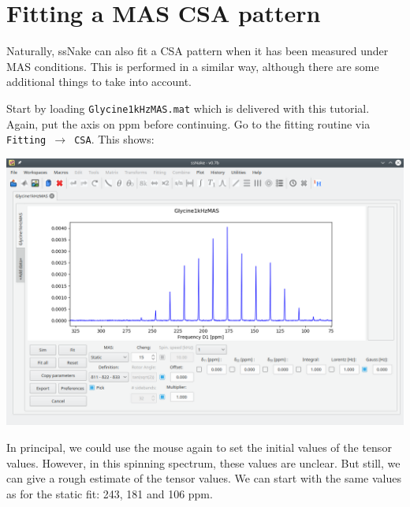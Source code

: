\documentclass[11pt,a4paper]{article}
\begin{document}
\section{Fitting a MAS CSA pattern}
Naturally, ssNake can also fit a CSA pattern when it has been measured under MAS conditions.
This is performed in a similar way, although there are some additional things to take into account.

Start by loading \texttt{Glycine1kHzMAS.mat} which is delivered with this tutorial.
Again, put the axis on ppm before continuing.
Go to the fitting routine via \texttt{Fitting $\longrightarrow$ CSA}.
This shows:
\begin{center}
\includegraphics[width=0.8\linewidth]{Figs/Fig7.png}
\end{center}
In principal, we could use the mouse again to set the initial values of the tensor values.
However, in this spinning spectrum, these values are unclear.
But still, we can give a rough estimate of the tensor values.
We can start with the same values as for the static fit: 243, 181 and 106 ppm.
\end{document}
